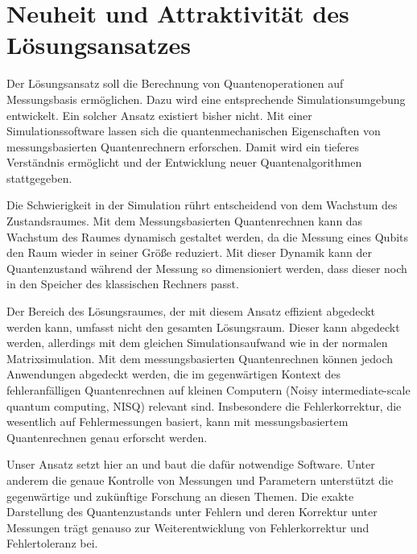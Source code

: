 \documentclass[11pt, a4paper]{article}
\newcommand{\instruction}[1]{{}}
\begin{document}
\section{Neuheit und Attraktivität des Lösungsansatzes}

\instruction{Vorteile gegenüber konkurrierenden Lösungsansätzen}

\instruction{Nutzen für konkrete Anwendungen über den oben benannten
  Beispielfall hinaus}

\instruction{Angesprochene Zielgruppe/Anwendungsbereich}

\instruction{Open Innovation Optionen}

Der Lösungsansatz soll die Berechnung von Quantenoperationen auf
Messungsbasis ermöglichen. Dazu wird eine entsprechende
Simulationsumgebung entwickelt. Ein solcher Ansatz existiert bisher
nicht. Mit einer Simulationssoftware lassen sich die
quantenmechanischen Eigenschaften von messungsbasierten
Quantenrechnern erforschen. Damit wird ein tieferes Verständnis
ermöglicht und der Entwicklung neuer Quantenalgorithmen stattgegeben.

Die Schwierigkeit in der Simulation rührt entscheidend von dem
Wachstum des Zustandsraumes. Mit dem Messungsbasierten Quantenrechnen
kann das Wachstum des Raumes dynamisch gestaltet werden, da die
Messung eines Qubits den Raum wieder in seiner Größe reduziert. Mit
dieser Dynamik kann der Quantenzustand während der Messung so
dimensioniert werden, dass dieser noch in den Speicher des klassischen
Rechners passt.

Der Bereich des Lösungsraumes, der mit diesem Ansatz effizient
abgedeckt werden kann, umfasst nicht den gesamten Lösungsraum. Dieser
kann abgedeckt werden, allerdings mit dem gleichen Simulationsaufwand
wie in der normalen Matrixsimulation.  Mit dem messungsbasierten
Quantenrechnen können jedoch Anwendungen abgedeckt werden, die im
gegenwärtigen Kontext des fehleranfälligen Quantenrechnen auf kleinen
Computern (Noisy intermediate-scale quantum computing, NISQ) relevant
sind. Insbesondere die Fehlerkorrektur, die wesentlich auf
Fehlermessungen basiert, kann mit messungsbasiertem Quantenrechnen
genau erforscht werden.

Unser Ansatz setzt hier an und baut die dafür notwendige
Software. Unter anderem die genaue Kontrolle von Messungen und
Parametern unterstützt die gegenwärtige und zukünftige Forschung an
diesen Themen. Die exakte Darstellung des Quantenzustands unter
Fehlern und deren Korrektur unter Messungen trägt genauso zur
Weiterentwicklung von Fehlerkorrektur und Fehlertoleranz bei.
\end{document}
